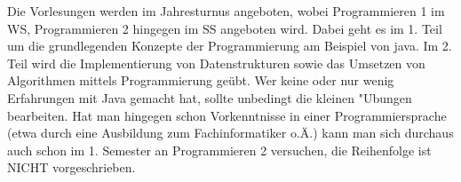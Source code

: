 Die Vorlesungen werden im Jahresturnus angeboten, wobei Programmieren 1
im WS, Programmieren 2 hingegen im SS angeboten wird. 
Dabei geht es im 1.
Teil um die grundlegenden Konzepte der Programmierung am Beispiel von
java. Im 2. Teil wird
die Implementierung von Datenstrukturen sowie das Umsetzen von
Algorithmen mittels Programmierung geübt. 
Wer keine oder nur wenig Erfahrungen mit Java gemacht hat, sollte unbedingt die kleinen "Ubungen bearbeiten.
Hat man hingegen schon Vorkenntnisse in einer Programmiersprache (etwa
durch eine Ausbildung zum Fachinformatiker o.Ä.) kann man sich
durchaus auch schon im 1. Semester an Programmieren 2 versuchen, die
Reihenfolge ist NICHT vorgeschrieben. 





